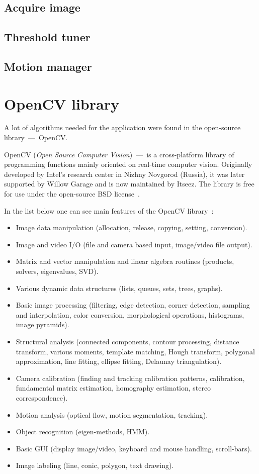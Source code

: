 \subsection{Acquire image}

\subsection{Threshold tuner}

\subsection{Motion manager}

\section{OpenCV library}

A lot of algorithms needed for the application were found in the open-source library~---~OpenCV.

OpenCV (\textit{Open Source Computer Vision})~---~is a cross-platform library of programming functions mainly oriented on real-time computer vision. Originally developed by Intel's research center in Nizhny Novgorod (Russia), it was later supported by Willow Garage and is now maintained by Itseez. The library is free for use under the open-source BSD license~\cite{Reference3}.

In the list below one can see main features of the OpenCV library~\cite{Reference4}:
\begin{itemize}
\setlength\itemsep{-0.5em}
\item Image data manipulation (allocation, release, copying, setting, conversion).
\item Image and video I/O (file and camera based input, image/video file output).
\item Matrix and vector manipulation and linear algebra routines (products, solvers, eigenvalues, SVD).
\item Various dynamic data structures (lists, queues, sets, trees, graphs).
\item Basic image processing (filtering, edge detection, corner detection, sampling and interpolation, color conversion, morphological operations, histograms, image pyramids).
\item Structural analysis (connected components, contour processing, distance transform, various moments, template matching, Hough transform, polygonal approximation, line fitting, ellipse fitting, Delaunay triangulation).
\item Camera calibration (finding and tracking calibration patterns, calibration, fundamental matrix estimation, homography estimation, stereo correspondence).
\item Motion analysis (optical flow, motion segmentation, tracking).
\item Object recognition (eigen-methods, HMM).
\item Basic GUI (display image/video, keyboard and mouse handling, scroll-bars).
\item Image labeling (line, conic, polygon, text drawing).
\end{itemize}



